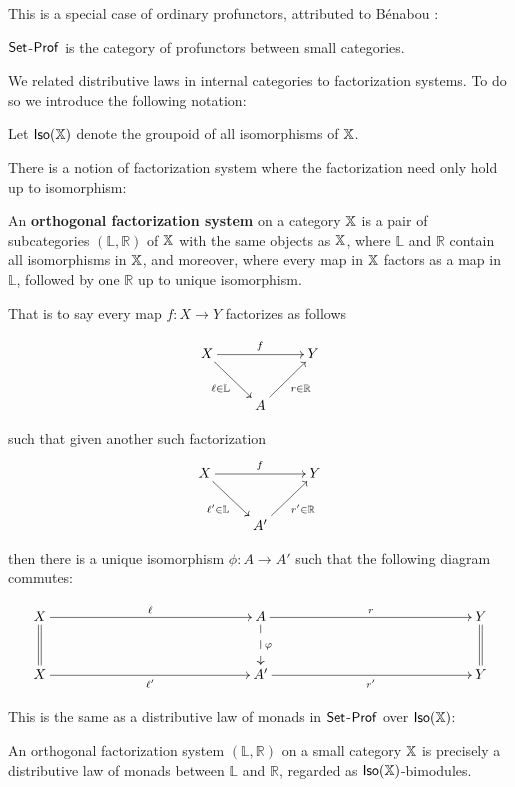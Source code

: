 This is a special case of ordinary profunctors, attributed to B\'enabou \cite{???}:

\begin{example}
$\mathsf{Set}$-${\sf Prof}$ is the category of profunctors between small categories.
\end{example}


We related distributive laws in internal categories to factorization systems.  To do so we introduce the following notation:

\begin{definition}
Let ${\sf Iso}(\mathbb{X})$ denote the groupoid  of all isomorphisms of $\mathbb{X}$.
\end{definition}

There is a notion of factorization system where the factorization need only hold up to isomorphism:
\begin{definition}
An {\bf orthogonal factorization system} on a category $\mathbb{X}$ is a pair of subcategories $(\mathbb{L},\mathbb{R})$ of $\mathbb{X}$ with the same objects as $\mathbb{X}$, where $\mathbb{L}$ and $\mathbb{R}$ contain all isomorphisms in $\mathbb{X}$, and moreover, where every map in $\mathbb{X}$ factors as a map in  $\mathbb{L}$, followed by one $\mathbb{R}$ up to unique isomorphism.


That is to say every map $f:X\to Y$ factorizes as follows


$$
\xymatrix{
X  \ar[rr]^{f} \ar[dr]_{\ell \in {\mathbb L}} &       & Y\\
   & A \ar[ur]_{r \in {\mathbb R}}
}
$$

such that given another such factorization
$$
\xymatrix{
X  \ar[rr]^{f} \ar[dr]_{\ell' \in {\mathbb L}} &       & Y\\
   & A' \ar[ur]_{r' \in {\mathbb R}}
}
$$

then there is a unique isomorphism $\phi:A\to A'$ such that the following diagram commutes:

$$
\xymatrixrowsep{10mm}
\xymatrixcolsep{50mm}
\xymatrix{
X \ar@{=}[d] \ar[r]^{\ell}   & A  \ar@{-->}[d]^{\phi} \ar[r]^{r} & Y \ar@{=}[d]\\
X   \ar[r]_{\ell'}                & A' \ar[r]_{r'} & Y
}
$$

\end{definition}

This is the same as a distributive law of monads in $\mathsf{Set}$-${\sf Prof}$ over ${\sf Iso}(\mathbb{X})$:

\begin{lemma}
An orthogonal factorization system $(\mathbb{L},\mathbb{R})$ on a small category $\mathbb{X}$ is precisely a distributive law of monads between $\mathbb{L}$ and $\mathbb{R}$, regarded as ${\sf Iso}(\mathbb{X})$-bimodules.
\end{lemma}

